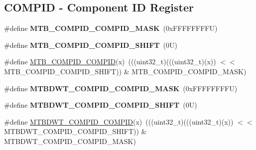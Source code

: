 \subsection*{C\+O\+M\+P\+ID -\/ Component ID Register}
\begin{DoxyCompactItemize}
\item 
\mbox{\label{group___m_t_b___register___masks_ga29964fec46d0063c44f12d25e96d2374}} 
\#define {\bfseries M\+T\+B\+\_\+\+C\+O\+M\+P\+I\+D\+\_\+\+C\+O\+M\+P\+I\+D\+\_\+\+M\+A\+SK}~(0x\+F\+F\+F\+F\+F\+F\+F\+F\+U)
\item 
\mbox{\label{group___m_t_b___register___masks_ga3511be4cfe57cca4ef93611ab64b624a}} 
\#define {\bfseries M\+T\+B\+\_\+\+C\+O\+M\+P\+I\+D\+\_\+\+C\+O\+M\+P\+I\+D\+\_\+\+S\+H\+I\+FT}~(0\+U)
\item 
\#define \mbox{\hyperlink{group___m_t_b___register___masks_gab89e1c5c517beb278cca39848b5932fb}{M\+T\+B\+\_\+\+C\+O\+M\+P\+I\+D\+\_\+\+C\+O\+M\+P\+ID}}(x)~(((uint32\+\_\+t)(((uint32\+\_\+t)(x)) $<$$<$ M\+T\+B\+\_\+\+C\+O\+M\+P\+I\+D\+\_\+\+C\+O\+M\+P\+I\+D\+\_\+\+S\+H\+I\+FT)) \& M\+T\+B\+\_\+\+C\+O\+M\+P\+I\+D\+\_\+\+C\+O\+M\+P\+I\+D\+\_\+\+M\+A\+SK)
\item 
\mbox{\label{group___m_t_b___register___masks_ga6b80c05493bf46a1572b3f25fda4764b}} 
\#define {\bfseries M\+T\+B\+D\+W\+T\+\_\+\+C\+O\+M\+P\+I\+D\+\_\+\+C\+O\+M\+P\+I\+D\+\_\+\+M\+A\+SK}~(0x\+F\+F\+F\+F\+F\+F\+F\+F\+U)
\item 
\mbox{\label{group___m_t_b___register___masks_ga26fe709d00d1433ca5a041dc307adfaa}} 
\#define {\bfseries M\+T\+B\+D\+W\+T\+\_\+\+C\+O\+M\+P\+I\+D\+\_\+\+C\+O\+M\+P\+I\+D\+\_\+\+S\+H\+I\+FT}~(0\+U)
\item 
\#define \mbox{\hyperlink{group___m_t_b___register___masks_ga96051e4614a093622983f79511da83b1}{M\+T\+B\+D\+W\+T\+\_\+\+C\+O\+M\+P\+I\+D\+\_\+\+C\+O\+M\+P\+ID}}(x)~(((uint32\+\_\+t)(((uint32\+\_\+t)(x)) $<$$<$ M\+T\+B\+D\+W\+T\+\_\+\+C\+O\+M\+P\+I\+D\+\_\+\+C\+O\+M\+P\+I\+D\+\_\+\+S\+H\+I\+FT)) \& M\+T\+B\+D\+W\+T\+\_\+\+C\+O\+M\+P\+I\+D\+\_\+\+C\+O\+M\+P\+I\+D\+\_\+\+M\+A\+SK)
\item 
\mbox{\label{group___m_t_b___register___masks_gae20c6541595b7ae93be71b45403230b7}} 

\end{DoxyCompactItemize}
